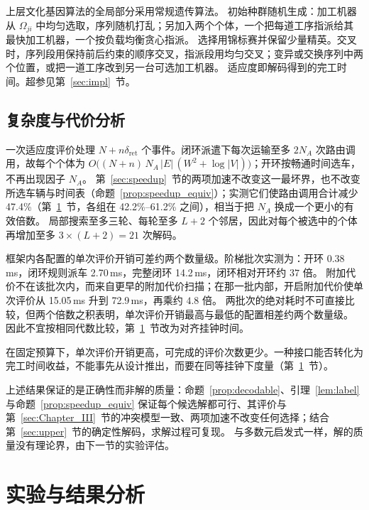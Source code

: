 \documentclass[manuscript,screen,review]{acmart}
\newcommand{\RouteCallCutLo}{42.2\%}     %
\newcommand{\RouteCallCutHi}{61.2\%}     %
\newcommand{\RouteCallCut}{47.4\%}
\newcommand{\MsOpen}{0.38}
\newcommand{\MsLoopRule}{2.70}
\newcommand{\MsLoopProbe}{14.2}
\newcommand{\MsPriced}{72.9}
\newcommand{\MsPricedRef}{15.05}         %
\begin{document}
上层文化基因算法的全局部分采用常规遗传算法。
初始种群随机生成：加工机器从 $\Omega_{ji}$ 中均匀选取，序列随机打乱；另加入两个个体，一个把每道工序指派给其最快加工机器，一个按负载均衡贪心指派。
选择用锦标赛并保留少量精英。交叉时，序列段用保持前后约束的顺序交叉，指派段用均匀交叉；变异或交换序列中两个位置，或把一道工序改到另一台可选加工机器。
适应度即解码得到的完工时间。超参见第~\ref{sec:impl}~节。

\subsection{复杂度与代价分析}

一次适应度评价处理 $N+n\delta_{\mathrm{ret}}$ 个事件。闭环派遣下每次运输至多 $2N_A$ 次路由调用，故每个个体为
$O\bigl((N+n)\,N_A\,|E|\,(W^{2}+\log|V|)\bigr)$；开环按畅通时间选车，不再出现因子 $N_A$。
第~\ref{sec:speedup}~节的两项加速不改变这一最坏界，也不改变所选车辆与时间表（命题~\ref{prop:speedup_equiv}）；实测它们使路由调用合计减少 \RouteCallCut{}（第~\ref{sec:Chapter_V}~节，各组在 \RouteCallCutLo{}--\RouteCallCutHi{} 之间），相当于把 $N_A$ 换成一个更小的有效倍数。
局部搜索至多三轮、每轮至多 $L+2$ 个邻居，因此对每个被选中的个体再增加至多 $3\times(L+2)=21$ 次解码。

框架内各配置的单次评价开销可差约两个数量级。阶梯批次实测为：开环 \MsOpen{}\,ms，闭环规则派车 \MsLoopRule{}\,ms，完整闭环 \MsLoopProbe{}\,ms，闭环相对开环约 $37$ 倍。
附加代价不在该批次内，而来自更早的附加代价扫描；在那一批内部，开启附加代价使单次评价从 \MsPricedRef{}\,ms 升到 \MsPriced{}\,ms，再乘约 $4.8$ 倍。
两批次的绝对耗时不可直接比较，但两个倍数之积表明，单次评价开销最高与最低的配置相差约两个数量级。
因此不宜按相同代数比较，第~\ref{sec:Chapter_V}~节改为对齐挂钟时间。

在固定预算下，单次评价开销更高，可完成的评价次数更少。一种接口能否转化为完工时间收益，不能事先从设计推出，而要在同等挂钟下度量（第~\ref{sec:Chapter_V}~节）。

上述结果保证的是正确性而非解的质量：命题~\ref{prop:decodable}、引理~\ref{lem:label} 与命题~\ref{prop:speedup_equiv} 保证每个候选解都可行、其评价与第~\ref{sec:Chapter_III}~节的冲突模型一致、两项加速不改变任何选择；结合第~\ref{sec:upper}~节的确定性解码，求解过程可复现。
与多数元启发式一样，解的质量没有理论界，由下一节的实验评估。

\section{实验与结果分析}
\label{sec:Chapter_V}
\end{document}
